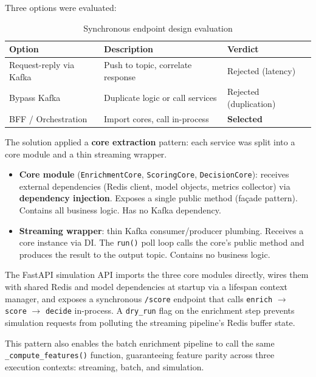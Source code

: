 Three options were evaluated:

\begin{table}[H]
\centering
\caption{Synchronous endpoint design evaluation}
\label{tab:sync-options}
\begin{tabular}{@{}lll@{}}
\toprule
\textbf{Option} & \textbf{Description} & \textbf{Verdict} \\
\midrule
Request-reply via Kafka & Push to topic, correlate response & Rejected (latency) \\
Bypass Kafka            & Duplicate logic or call services  & Rejected (duplication) \\
BFF / Orchestration     & Import cores, call in-process     & \textbf{Selected} \\
\bottomrule
\end{tabular}
\end{table}

The solution applied a \textbf{core extraction} pattern: each service was split into
a core module and a thin streaming wrapper.

\begin{itemize}[leftmargin=2cm]
    \item \textbf{Core module} (\texttt{EnrichmentCore}, \texttt{ScoringCore},
          \texttt{DecisionCore}): receives external dependencies (Redis client, model
          objects, metrics collector) via \textbf{dependency injection}. Exposes a
          single public method (façade pattern). Contains all business logic. Has no
          Kafka dependency.

    \item \textbf{Streaming wrapper}: thin Kafka consumer/producer plumbing. Receives
          a core instance via DI. The \texttt{run()} poll loop calls the core's public
          method and produces the result to the output topic. Contains no business
          logic.
\end{itemize}

The FastAPI simulation API imports the three core modules directly, wires them with
shared Redis and model dependencies at startup via a lifespan context manager, and
exposes a synchronous \texttt{/score} endpoint that calls
\texttt{enrich} $\rightarrow$ \texttt{score} $\rightarrow$ \texttt{decide}
in-process. A \texttt{dry\_run} flag on the enrichment step prevents simulation
requests from polluting the streaming pipeline's Redis buffer state.

This pattern also enables the batch enrichment pipeline to call the same
\texttt{\_compute\_features()} function, guaranteeing feature parity across three
execution contexts: streaming, batch, and simulation.